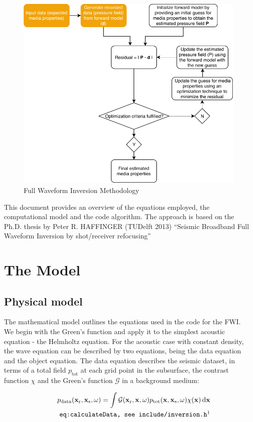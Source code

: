 \documentclass[10pt,a4paper]{article}
\newcommand{\df}[1]{\, \ensuremath{\mbox{d}#1}}
\newcommand{\xs}{\mathbf{x}_\text{s}}
\newcommand{\xr}{\mathbf{x}_\text{r}}
\newcommand{\x}{\mathbf{x}}
\begin{document}
\begin{figure}[h!]
  \includegraphics[width=0.75\linewidth]{FWI_crop.pdf}
  \caption{Full Waveform Inversion Methodology} 
  \label{fig:FWI2}
\end{figure}

This document provides an overview of the
equations employed, the computational model and the code algorithm.
The approach is based on the Ph.D. thesis by Peter R. HAFFINGER (TUDelft 2013) ``Seismic Broadband Full Waveform Inversion
by shot/receiver refocusing''
\section{The Model}
\subsection{Physical model}

The mathematical model outlines the equations used in the code for the FWI.
We begin with the Green's function and apply it to the
simplest acoustic equation - the Helmholtz equation.
For the acoustic case with constant density, the wave equation can be
described by two equations,
being the data equation and the object equation. The data equation
describes the seismic dataset, in terms of a total field
$p_{\text{tot}}$ at each grid point in the subsurface, the contrast
function $\chi$ and the Green's function $\mathcal{G}$
in a background medium: 

\begin{align}
\label{eq:calculateData}
p_\text{data}(\mathbf{x_\text{r}},\mathbf{x_\text{s}},\omega) = \int
\mathcal{G}(\xr, \x, \omega) p_\text{tot}(\x, \xs, \omega) \chi(\x)
\df{\x}\\
\tag*{\texttt{eq:calculateData, see include/inversion.h\footnotemark}}
\end{align}
\end{document}
